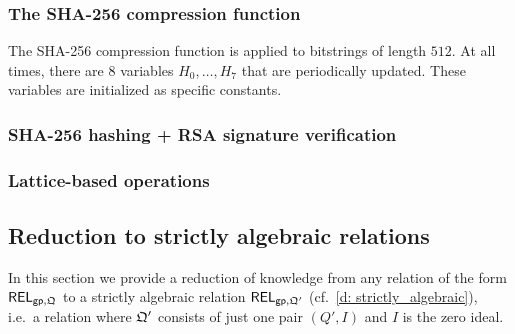 \documentclass[11pt,letterpaper,usenames,dvipsnames]{article}
\begin{document}
\subsubsection{The SHA-256 compression function}

The SHA-256 compression function is applied to bitstrings of length $512$. At all times, there are $8$ variables $H_0,\ldots, H_7$ that are periodically updated.  These variables are initialized as specific constants.




\subsubsection{SHA-256 hashing + RSA signature verification}

\subsubsection{Lattice-based operations}


\subsection{Reduction to strictly algebraic relations}
\label{sec:reduction-to-algebraic-relations}

In this section we provide a reduction of knowledge from  any relation of the form $\mathsf{REL}_{\mathsf{gp}, \mathfrak{Q}}$ to a strictly algebraic relation $\mathsf{REL}_{\mathsf{gp}, \mathfrak{Q}'}$ (cf.\ \cref{d: strictly_algebraic}), i.e.\ a relation where  $\mathfrak{Q}'$ consists of just one pair $(Q', I)$ and $I$ is the zero  ideal. 
\end{document}
